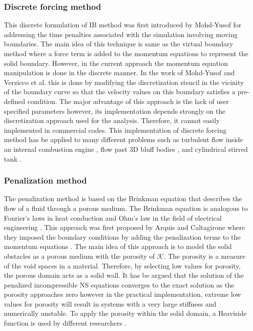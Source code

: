 \subsubsection{Discrete forcing method}
This discrete formulation of IB method was first introduced by Mohd-Yusof \cite{mohd1997combined} for addressing the time penalties associated with the simulation involving moving boundaries. The main idea of this technique is same as the virtual boundary method where a force term is added to the momentum equations to represent the solid boundary. However, in the current approach the momentum equation manipulation is done in the discrete manner. In the work of Mohd-Yusof \cite{mohd1997combined} and Verzicco et al. \cite{verzicco1998complex} this is done by modifying the discretization stencil in the vicinity of the boundary curve so that the velocity values on this boundary satisfies a pre-defined condition. The major advantage of this approach is the lack of user specified parameters however, its implementation depends strongly on the discretization approach used for the analysis. Therefore, it cannot easily implemented in commercial codes. This implementation of discrete forcing method has be applied to many different problems such as turbulent flow inside an internal combustion engine \cite{verzicco1998complex}, flow past 3D bluff bodies \cite{verzicco2002large}, and cylindrical stirred tank \cite{iaccarino2003immersed}.

\subsubsection{Penalization method}
The penalization method is based on the Brinkman equation that describes the flow of a fluid through a porous medium. The Brinkman equation is analogous to Fourier's laws in heat conduction and Ohm's law in the field of electrical engineering \cite{durlofsky1987analysis}. This approach was first proposed by Arquis and Caltagirone where they imposed the boundary conditions by adding the penalization terms to the momentum equations \cite{arquis1984conditions}. The main idea of this approach is to model the solid obstacles as a porous medium with the porosity of $\mathcal{K}$. The porosity is a measure of the void spaces in a material. Therefore, by selecting low values for porosity, the porous domain acts as a solid wall. It has be argued that the solution of the penalized incompressible NS equations converges to the exact solution as the porosity approaches zero \cite{angot1999analysis} however in the practical implementation, extreme low values for porosity will result in systems with a very large stiffness and numerically unstable. To apply the porosity within the solid domain, a Heaviside function is used by different researchers \cite{gazzola2011simulations, kevlahan2001computation}.

